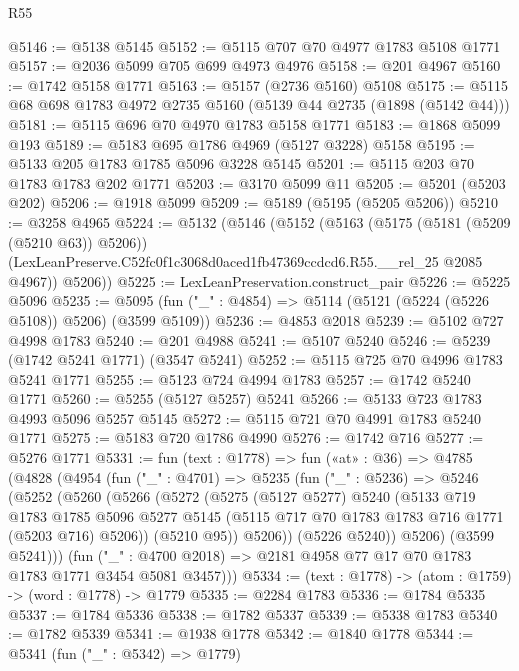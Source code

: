 \begin{lexlean}{R55}
\begin{coremodule}
@5146 := @5138 @5145
@5152 := @5115 @707 @70 @4977 @1783 @5108 @1771
@5157 := @2036 @5099 @705 @699 @4973 @4976
@5158 := @201 @4967
@5160 := @1742 @5158 @1771
@5163 := @5157 (@2736 @5160) @5108
@5175 := @5115 @68 @698 @1783 @4972 @2735 @5160 (@5139 @44 @2735 (@1898 (@5142 @44)))
@5181 := @5115 @696 @70 @4970 @1783 @5158 @1771
@5183 := @1868 @5099 @193
@5189 := @5183 @695 @1786 @4969 (@5127 @3228) @5158
@5195 := @5133 @205 @1783 @1785 @5096 @3228 @5145
@5201 := @5115 @203 @70 @1783 @1783 @202 @1771
@5203 := @3170 @5099 @11
@5205 := @5201 (@5203 @202)
@5206 := @1918 @5099
@5209 := @5189 (@5195 (@5205 @5206))
@5210 := @3258 @4965
@5224 := @5132
    (@5146
      (@5152
        (@5163
          (@5175 (@5181 (@5209 (@5210 @63)) @5206))
          (LexLeanPreserve.C52fc0f1c3068d0aced1fb47369ccdcd6.R55.__rel_25 @2085 @4967))
        @5206))
@5225 := LexLeanPreservation.construct_pair
@5226 := @5225 @5096
@5235 := @5095 (fun ("_" : @4854) => @5114 (@5121 (@5224 (@5226 @5108)) @5206) (@3599 @5109))
@5236 := @4853 @2018
@5239 := @5102 @727 @4998 @1783
@5240 := @201 @4988
@5241 := @5107 @5240
@5246 := @5239 (@1742 @5241 @1771) (@3547 @5241)
@5252 := @5115 @725 @70 @4996 @1783 @5241 @1771
@5255 := @5123 @724 @4994 @1783
@5257 := @1742 @5240 @1771
@5260 := @5255 (@5127 @5257) @5241
@5266 := @5133 @723 @1783 @4993 @5096 @5257 @5145
@5272 := @5115 @721 @70 @4991 @1783 @5240 @1771
@5275 := @5183 @720 @1786 @4990
@5276 := @1742 @716
@5277 := @5276 @1771
@5331 := fun (text : @1778) =>
  fun («at» : @36) =>
  @4785
    (@4828
      (@4954
        (fun ("_" : @4701) =>
        @5235
          (fun ("_" : @5236) =>
          @5246
            (@5252
              (@5260
                (@5266
                  (@5272
                    (@5275
                      (@5127 @5277)
                      @5240
                      (@5133
                        @719
                        @1783
                        @1785
                        @5096
                        @5277
                        @5145
                        (@5115 @717 @70 @1783 @1783 @716 @1771 (@5203 @716) @5206))
                      (@5210 @95))
                    @5206))
                (@5226 @5240))
              @5206)
            (@3599 @5241)))
        (fun ("_" : @4700 @2018) => @2181 @4958 @77 @17 @70 @1783 @1783 @1771 @3454 @5081 @3457)))
@5334 := (text : @1778) -> (atom : @1759) -> (word : @1778) -> @1779
@5335 := @2284 @1783
@5336 := @1784 @5335
@5337 := @1784 @5336
@5338 := @1782 @5337
@5339 := @5338 @1783
@5340 := @1782 @5339
@5341 := @1938 @1778
@5342 := @1840 @1778
@5344 := @5341 (fun ("_" : @5342) => @1779)

\end{coremodule}
\end{lexlean}

